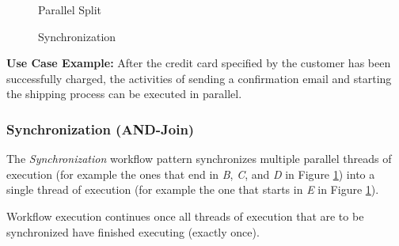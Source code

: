 \begin{figure}[htb]
  \begin{minipage}{0.45\textwidth}
    \begin{center}
      \caption[The \emph{Parallel Split} workflow pattern]{Parallel Split}
      \label{figure-ParallelSplit}
    \end{center}
  \end{minipage}
  \hfill
  \begin{minipage}{0.45\textwidth}
    \begin{center}
      \caption[The \emph{Synchronization} workflow pattern]{Synchronization}
      \label{figure-Synchronization}
    \end{center}
  \end{minipage}
\end{figure}

\textbf{Use Case Example:} After the credit card specified by the customer has been
successfully charged, the activities of sending a confirmation email and
starting the shipping process can be executed in parallel.

\subsubsection{Synchronization (AND-Join)}

The \emph{Synchronization} workflow pattern synchronizes multiple parallel
threads of execution (for example the ones that end in \emph{B}, \emph{C},
and \emph{D} in Figure \ref{figure-Synchronization}) into a single thread of
execution (for example the one that starts in \emph{E} in Figure
\ref{figure-Synchronization}).

Workflow execution continues once all threads of execution that are to be
synchronized have finished executing (exactly once).

